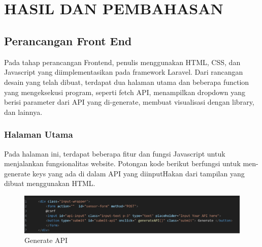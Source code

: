 \chapter[HASIL DAN PEMBAHASAN]{\\HASIL DAN PEMBAHASAN}

\section{Perancangan Front End}
Pada tahap perancangan Frontend, penulis menggunakan HTML, CSS, dan Javascript yang diimplementasikan pada framework Laravel. Dari rancangan desain yang telah dibuat, terdapat dua halaman utama dan beberapa function yang mengeksekusi program, seperti fetch API, menampilkan dropdown yang berisi parameter dari API yang di-generate, membuat visualisasi dengan library, dan lainnya. 

\subsection{Halaman Utama}
Pada halaman ini, terdapat beberapa fitur dan fungsi Javascript untuk menjalankan fungsionalitas website. Potongan kode berikut berfungsi untuk men-generate keys yang ada di dalam API yang diinputHakan dari tampilan yang dibuat menggunakan HTML. 
	\begin{figure}[H]
	\centering
	\includegraphics[width=0.8\linewidth]{gambar/Pembahasan/generate API.png}
	\caption{Generate API}
	\label{Generate API}
\end{figure}

